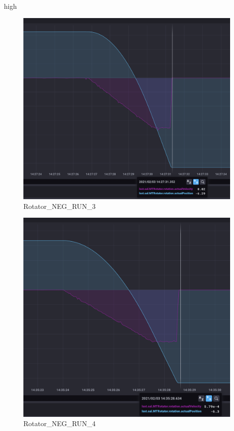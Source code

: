 high\documentclass[SE,lsstdraft,authoryear,toc]{lsstdoc}
\begin{document}
\begin{figure}[h!]
  \includegraphics[width=\linewidth]{media/Rotator_design_speed_neg_test3.png}
  \caption{Rotator\_NEG\_RUN\_3}
  \label{fig:Rotator_NEG_RUN_3}
\end{figure}
\begin{figure}[h!]
  \includegraphics[width=\linewidth]{media/Rotator_design_speed_neg_test4.png}
  \caption{Rotator\_NEG\_RUN\_4}
  \label{fig:Rotator_NEG_RUN_4}
\end{figure}
\end{document}

